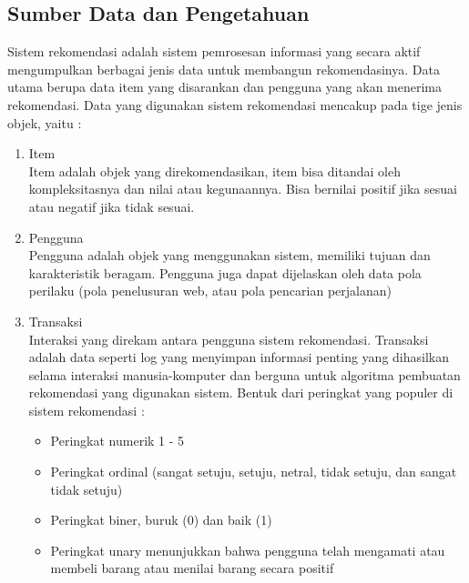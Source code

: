 \subsection{Sumber Data dan Pengetahuan}
\label{sec:sumber data dan pengetahuan}
Sistem rekomendasi adalah sistem pemrosesan informasi yang secara aktif mengumpulkan berbagai jenis data untuk membangun rekomendasinya. Data utama berupa data item yang disarankan dan pengguna yang akan menerima rekomendasi. Data yang digunakan sistem rekomendasi mencakup pada tige jenis objek, yaitu : %
	\begin{enumerate}
	\item Item\\
		Item adalah objek yang direkomendasikan, item bisa ditandai oleh kompleksitasnya dan nilai atau kegunaannya. Bisa bernilai positif jika sesuai atau negatif jika tidak sesuai.
	
	\item Pengguna\\
		Pengguna adalah objek yang menggunakan sistem, memiliki tujuan dan karakteristik beragam. Pengguna juga dapat dijelaskan oleh data pola perilaku (pola penelusuran web, atau pola pencarian perjalanan)
	
	\item Transaksi\\
		Interaksi yang direkam antara pengguna sistem rekomendasi. Transaksi adalah data seperti log yang menyimpan informasi penting yang dihasilkan selama interaksi manusia-komputer dan berguna untuk algoritma pembuatan rekomendasi yang digunakan sistem. Bentuk dari peringkat yang populer di sistem rekomendasi :
		
		\begin{itemize}
			\item Peringkat numerik 1 - 5
		
			\item Peringkat ordinal (sangat setuju, setuju, netral, tidak setuju, dan sangat tidak setuju)
		
			\item Peringkat biner, buruk (0) dan baik (1)
		
			\item Peringkat unary menunjukkan bahwa pengguna telah mengamati atau membeli barang atau menilai barang secara positif
		\end{itemize}
		
	\end{enumerate}
	
